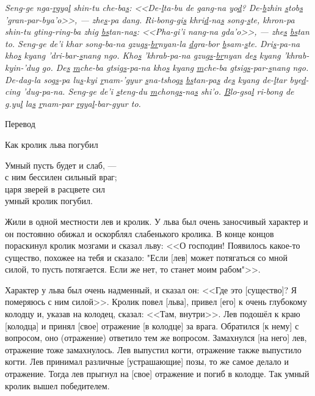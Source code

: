 \emph{Seng-ge nga-\ul{r}gya\ul{l} shin-tu che-ba\ul{s}: <<De-\ul{l}ta-bu de gang-na yo\ul{d}?
De-\ul{b}zhin \ul{s}tob\ul{s} 'gran-par-bya'o>>, --- zhe\ul{s}-pa dang.
Ri-bong-gi\ul{s} khri\ul{d}-na\ul{s} song-\ul{s}te,
khron-pa shin-tu \ul{g}ting-ring-ba zhig \ul{bs}tan-na\ul{s}: <<Pha-gi'i nang-na \ul{g}da'o>>, ---
zhe\ul{s} \ul{bs}tan to.
Seng-ge de'i khar song-ba-na gzug\ul{s}-\ul{br}nyan-la \ul{d}gra-bor \ul{b}sam-\ul{s}te.
Dri\ul{s}-pa-na kho\ul{s} kyang 'dri-bar-\ul{s}nang ngo.
Kho\ul{s} 'khrab-pa-na \ul{g}zug\ul{s}-\ul{br}nyan de\ul{s} kyang 'khrab-kyin-'dug go.
De\ul{s} \ul{m}che-ba \ul{g}tsig\ul{s}-pa-na kho\ul{s} kyang \ul{m}che-ba \ul{g}tsig\ul{s}-par-\ul{s}nang ngo.
De-dag-la sog\ul{s}-pa lu\ul{s}-kyi \ul{r}nam-'gyur \ul{s}na-tshog\ul{s} \ul{bs}tan-pa\ul{s} de\ul{s} kyang de-\ul{l}tar bye\ul{d}-cing 'dug-pa-na.
Seng-ge de'i \ul{s}teng-du \ul{m}chong\ul{s}-na\ul{s} shi'o.
\ul{B}lo-\ul{g}sa\ul{l} ri-bong de g.yu\ul{l} la\ul{s} \ul{r}nam-par \ul{r}gya\ul{l}-bar-gyur to.
}

\begin{center}Перевод\end{center}

Как кролик льва погубил

\epigraph{Умный пусть будет и слаб, ---\\
с ним бессилен сильный враг;\\
царя зверей в расцвете сил\\
умный кролик погубил.}{}

Жили в одной местности лев и кролик. У льва был очень заносчивый характер и он постоянно обижал и оскорблял слабенького кролика. В конце концов пораскинул кролик мозгами и сказал льву: <<О господин! Появилось какое-то существо, похожее на тебя и сказало: "Если [лев] может потягаться со мной силой, то пусть потягается. Если же нет, то станет моим рабом"{}>>.

Характер у льва был очень надменный, и сказал он: <<Где это [существо]? Я померяюсь с ним силой>>. Кролик повел [льва], привел [его] к очень глубокому колодцу и,
указав на колодец, сказал: <<Там, внутри>>. Лев подошёл к краю [колодца] и принял [свое] отражение [в колодце] за врага. Обратился [к нему] с вопросом, оно (отражение) ответило тем же вопросом. Замахнулся [на него] лев, отражение тоже замахнулось. Лев выпустил когти, отражение также выпустило когти. Лев принимал различные [устрашающие] позы, то же самое делало и отражение. Тогда лев прыгнул на [свое] отражение и погиб в колодце. Так умный кролик вышел победителем.

